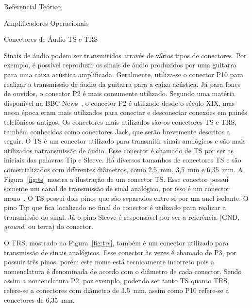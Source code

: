\begin{chapter}{Referencial Teórico}
\begin{section}{Amplificadores Operacionais}
\end{section}


\begin{section}{Conectores de Áudio TS e TRS}

Sinais de áudio podem ser transmitidos através de vários tipos de conectores.
Por exemplo, é possível reproduzir os sinais de áudio produzidos por uma
guitarra para uma caixa acústica amplificada. Geralmente, utiliza-se o conector
P10 para realizar a transmissão de áudio da guitarra para a caixa acústica. Já
para fones de ouvidos, o conector P2 é mais comumente utilizado. Segundo uma
matéria disponível na BBC News~\cite{BBC}, o conector P2 é utilizado desde o
século XIX, mas nessa época eram mais utilizados para conectar e desconectar 
conexões em painés telefônicos antigos. Os conectores mais utilizados são os 
conectores TS e TRS, também conhecidos como conectores Jack, que serão 
brevemente descritos a seguir.  
\newpage
O TS é um conector utilizado para transmitir sinais analógicos e são mais
utilizados natransmissão de áudio. Esse conector é chamado de TS por ser as
iniciais das palavras Tip e Sleeve. Há diversos tamanhos de
conectores TS e são comercializados com diferentes diâmetros, como 2,5~mm,
3,5~mm e 6,35~mm. A Figura~\ref{fig:ts} mostra a ilustração de um conector TS.
Esse conector possui somente um canal de transmissão de sinal analógico, por
isso é um conector mono~\cite{ts}. O TS possui dois pinos que são separados
entre si por um anel isolante. O pino Tip que  fica localizado no final do
conector é utilizado para realizar a  transmissão do sinal. Já o pino Sleeve é
responsável por ser a referência (GND, \textit{ground}, ou terra) do conector.

O TRS, mostrado na Figura~\ref{fig:trs}, também é um conector utilizado para
transmissão de sinais analógicos. Esse conector às vezes é chamado de P3, por
possuir três pinos, porém este nome está tecnicamente incorreto pois a
nomenclatura é denominada de acordo com o diâmetro de cada conector. Sendo assim
a nomenclatura P2, por exemplo, podendo ser tanto TS quanto TRS,  refere-se a
conectores com diâmetro de 3,5~mm, assim como P10 refere-se a conectores de
6,35~mm. 



\end{section}
\end{chapter}
